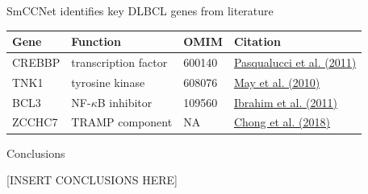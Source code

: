 \documentclass[ignorenonframetext,]{beamer}
\begin{document}
\begin{frame}{SmCCNet identifies key DLBCL genes from literature}
\protect\hypertarget{smccnet-identifies-key-dlbcl-genes-from-literature}{}

\begin{longtable}[]{@{}llll@{}}
\toprule
Gene & Function & OMIM & Citation\tabularnewline
\midrule
\endhead
CREBBP & transcription factor & 600140 &
\href{https://www.nature.com/articles/nature09730}{Pasqualucci et al.
(2011)}\tabularnewline
TNK1 & tyrosine kinase & 608076 &
\href{https://www.ncbi.nlm.nih.gov/pmc/articles/PMC2917161/}{May et al.
(2010)}\tabularnewline
BCL3 & NF-\(\kappa\)B inhibitor & 109560 &
\href{https://pubmed.ncbi.nlm.nih.gov/21752100/}{Ibrahim et al.
(2011)}\tabularnewline
ZCCHC7 & TRAMP component & NA &
\href{https://pubmed.ncbi.nlm.nih.gov/30348671/}{Chong et al.
(2018)}\tabularnewline
\bottomrule
\end{longtable}

\end{frame}

\begin{frame}{Conclusions}
\protect\hypertarget{conclusions}{}

{[}INSERT CONCLUSIONS HERE{]}

\end{frame}
\end{document}
